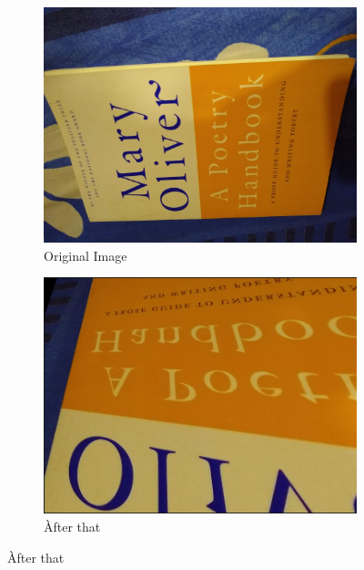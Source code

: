 \documentclass{article}
\begin{document}
\begin{figure}[ht!]
    \centering
    \begin{subfigure}[b]{0.4\linewidth}             \includegraphics[width=\linewidth]{im2.jpg}
    \caption{Original Image}
    \end{subfigure}
    \begin{subfigure}[b]{0.38\linewidth}           \includegraphics[width=\linewidth]{171_3.png}
    \caption{Àfter that}
    \end{subfigure}


\end{figure}
\end{document}
